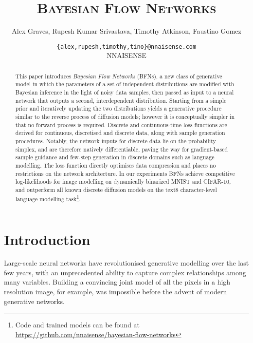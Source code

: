 \documentclass[11pt,table]{article}
\newcommand{\0}[1]{\constvec{0}{#1}}
\newcommand{\1}[1]{\constvec{1}{#1}}
\begin{document}
\title{\textsc{Bayesian Flow Networks}}
\author{Alex Graves, Rupesh Kumar Srivastava, Timothy Atkinson, Faustino Gomez}
\date{
\vspace{-6pt}
\texttt{\{alex,rupesh,timothy,tino\}@nnaisense.com}\\
\vspace{6pt}
NNAISENSE
}
\maketitle

\begin{abstract}
This paper introduces \emph{Bayesian Flow Networks} (BFNs), a new class of generative model in which the parameters of a set of independent distributions are modified with Bayesian inference in the light of noisy data samples, then passed as input to a neural network that outputs a second, interdependent distribution.
Starting from a simple prior and iteratively updating the two distributions yields a generative procedure similar to the reverse process of diffusion models; however it is conceptually simpler in that no forward process is required.
Discrete and continuous-time loss functions are derived for continuous, discretised and discrete data, along with sample generation procedures.
Notably, the network inputs for discrete data lie on the probability simplex, and are therefore natively differentiable, paving the way for gradient-based sample guidance and few-step generation in discrete domains such as language modelling.
The loss function directly optimises data compression and places no restrictions on the network architecture.
In our experiments BFNs achieve competitive log-likelihoods for image modelling on dynamically binarized MNIST and CIFAR-10, and outperform all known discrete diffusion models on the text8 character-level language modelling task\footnote{Code and trained models can be found at \url{https://github.com/nnaisense/bayesian-flow-networks}}.
\end{abstract}
\section{Introduction}
Large-scale neural networks have revolutionised generative modelling over the last few years, with an unprecedented ability to capture complex relationships among many variables. 
Building a convincing joint model of all the pixels in a high resolution image, for example, was impossible before the advent of modern generative networks.
\end{document}
